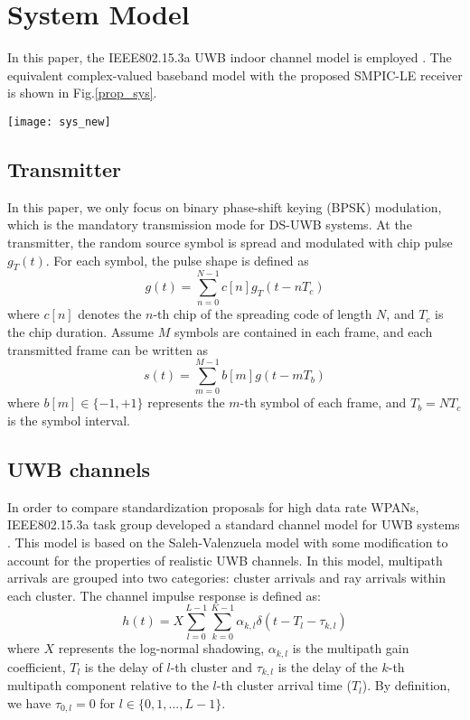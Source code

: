 \documentclass[journal]{IEEEtran}
\begin{document}
\section{System Model}
In this paper, the IEEE802.15.3a UWB indoor channel model is
employed \cite{Channel}. The equivalent complex-valued baseband
model with the proposed SMPIC-LE receiver is shown in
Fig.\ref{prop_sys}.

\begin{figure*}[t]
\begin{center}
  \texttt{[image: sys\_new]}
  \caption{Diagram of the DS-UWB System model with the SMPIC-LE receiver}
  \label{prop_sys}
\end{center}
\end{figure*}

\subsection{Transmitter}
In this paper, we only focus on binary phase-shift keying (BPSK)
modulation, which is the mandatory transmission mode for DS-UWB
systems. At the transmitter, the random source symbol is spread and
modulated with chip pulse $g_T(t)$. For each symbol, the pulse shape
is defined as
\begin{equation}
\label{symbol pulse} g(t)=\sum\limits_{n=0}^{N-1} c[n]g_T(t-nT_c)
\end{equation}
where $c[n]$ denotes the $n$-th chip of the spreading code of length
$N$, and $T_c$ is the chip duration. Assume $M$ symbols are
contained in each frame, and each transmitted frame can be written
as
\begin{equation}
\label{frame} s(t)=\sum\limits_{m=0}^{M-1} b[m]g(t-mT_b)
\end{equation}
where $b[m]\in\{-1,+1\}$ represents the $m$-th symbol of each frame,
and $T_b = NT_c$ is the symbol interval.

\subsection{UWB channels}
In order to compare standardization proposals for high data rate
WPANs, IEEE802.15.3a task group developed a standard channel model
for UWB systems \cite{Channel}. This model is based on the
Saleh-Valenzuela model \cite{S-V} with some modification to account
for the properties of realistic UWB channels. In this model,
multipath arrivals are grouped into two categories: cluster arrivals
and ray arrivals within each cluster. The channel impulse response
is defined as:
\begin{equation}
\label{channel}
h(t)=X\sum\limits_{l=0}^{L-1}\sum\limits_{k=0}^{K-1}\alpha_{k,l}\delta(t-T_l-\tau_{k,l})
\end{equation}
where $X$ represents the log-normal shadowing, $\alpha_{k,l}$ is the
multipath gain coefficient, $T_l$ is the delay of $l$-th cluster and
$\tau_{k,l}$ is the delay of the $k$-th multipath component relative
to the $l$-th cluster arrival time ($T_l$). By definition, we have
$\tau_{0,l} = 0$ for $l\in\{0,1,...,L-1\}$.
\end{document}
